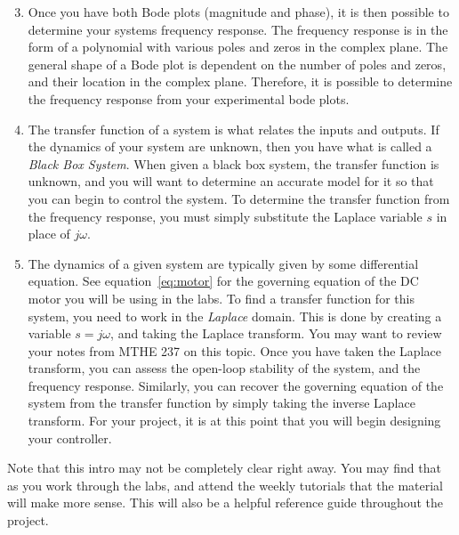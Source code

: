 \begin{enumerate}
    \setcounter{enumi}{2}
    \item Once you have both Bode plots (magnitude and phase), it is then possible to determine
          your systems frequency response. The frequency response is in the form of a polynomial with various poles and zeros 
          in the complex plane. The general shape of a Bode plot is dependent on the number of poles and zeros, 
          and their location in the complex plane. Therefore, it is possible to determine the frequency response from 
          your experimental bode plots. 
    \item The transfer function of a system is what relates the inputs and outputs. If the dynamics of your system are unknown,
          then you have what is called a \emph{Black Box System}. When given a black box system, the transfer 
          function is unknown, and you will want to determine an accurate model for it so that you can begin to control the 
          system. To determine the transfer function from the frequency response, you must simply substitute the Laplace variable 
          \(s\) in place of \(j\omega \).
    \item The dynamics of a given system are typically given by some differential equation. See equation~\ref{eq:motor}
          for the governing equation of the DC motor you will be using in the labs. To find a transfer function for this system, you 
          need to work in the \emph{Laplace} domain. This is done by creating  a variable \(s=j\omega \), and taking the 
          Laplace transform. You may want to review your notes from MTHE 237 on this topic. Once you have taken the 
          Laplace transform, you can assess the open-loop stability of the system, and the frequency response.
          Similarly, you can recover the governing equation of the system from the transfer function by simply taking 
          the inverse Laplace transform. For your project, it is at this point that you will begin designing your controller. 
\end{enumerate}
Note that this intro may not be completely clear right away. You may find that as you work through the labs, and 
attend the weekly tutorials that the material will make more sense. This will also be a helpful reference guide 
throughout the project.